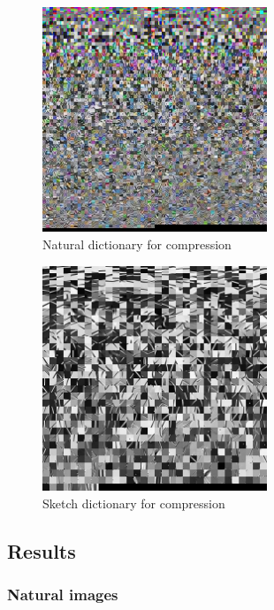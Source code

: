 \newpage
\begin{figure}[H]
\centering
\includegraphics[width = 0.6\textwidth]{images/natural_dict.jpg}
\caption{Natural dictionary for compression}\label{fig:naturalDict}
\end{figure}
\begin{figure}[H]
\centering
\includegraphics[width = 0.6\textwidth]{images/sketch_dict.jpg}
\caption{Sketch dictionary for compression}\label{fig:sketchDict}
\end{figure}


\clearpage
\subsection{Results}
\subsubsection{Natural images}

